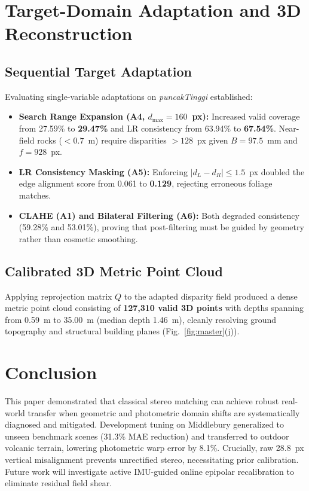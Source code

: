 \documentclass[journal]{IEEEtran}
\begin{document}
\section{Target-Domain Adaptation and 3D Reconstruction}
\subsection{Sequential Target Adaptation}
Evaluating single-variable adaptations on \textit{puncakTinggi} established:
\begin{itemize}
    \item \textbf{Search Range Expansion (A4, $d_{\max}=160$~px):} Increased valid coverage from 27.59\% to \textbf{29.47\%} and LR consistency from 63.94\% to \textbf{67.54\%}. Near-field rocks ($<0.7$~m) require disparities $>128$~px given $B=97.5$~mm and $f=928$~px.
    \item \textbf{LR Consistency Masking (A5):} Enforcing $|d_L - d_R| \le 1.5$~px doubled the edge alignment score from 0.061 to \textbf{0.129}, rejecting erroneous foliage matches.
    \item \textbf{CLAHE (A1) and Bilateral Filtering (A6):} Both degraded consistency (59.28\% and 53.01\%), proving that post-filtering must be guided by geometry rather than cosmetic smoothing.
\end{itemize}

\subsection{Calibrated 3D Metric Point Cloud}
Applying reprojection matrix $Q$ to the adapted disparity field produced a dense metric point cloud consisting of \textbf{127,310 valid 3D points} with depths spanning from 0.59~m to 35.00~m (median depth 1.46~m), cleanly resolving ground topography and structural building planes (Fig.~\ref{fig:master}(j)).

\section{Conclusion}
This paper demonstrated that classical stereo matching can achieve robust real-world transfer when geometric and photometric domain shifts are systematically diagnosed and mitigated. Development tuning on Middlebury generalized to unseen benchmark scenes (31.3\% MAE reduction) and transferred to outdoor volcanic terrain, lowering photometric warp error by 8.1\%. Crucially, raw 28.8~px vertical misalignment prevents unrectified stereo, necessitating prior calibration. Future work will investigate active IMU-guided online epipolar recalibration to eliminate residual field shear.



\end{document}
